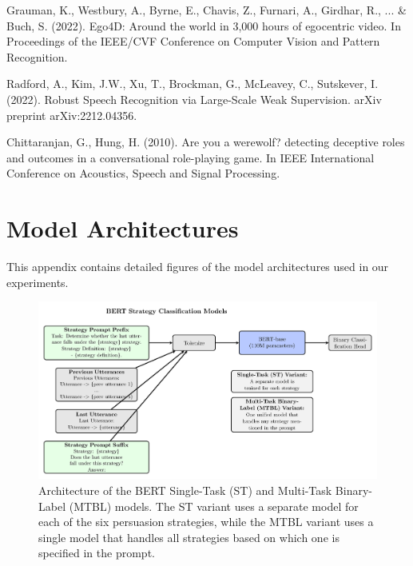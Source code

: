 \documentclass{article}
\begin{document}
\begin{thebibliography}{10}
Grauman, K., Westbury, A., Byrne, E., Chavis, Z., Furnari, A., Girdhar, R., ... \& Buch, S. (2022). Ego4D: Around the world in 3,000 hours of egocentric video. In Proceedings of the IEEE/CVF Conference on Computer Vision and Pattern Recognition.

Radford, A., Kim, J.W., Xu, T., Brockman, G., McLeavey, C., Sutskever, I. (2022). Robust Speech Recognition via Large-Scale Weak Supervision. arXiv preprint arXiv:2212.04356.

Chittaranjan, G., Hung, H. (2010). Are you a werewolf? detecting deceptive roles and outcomes in a conversational role-playing game. In IEEE International Conference on Acoustics, Speech and Signal Processing.

\end{thebibliography}

\appendix
\section{Model Architectures}
This appendix contains detailed figures of the model architectures used in our experiments.

\begin{figure}[H]
    \centering
    \includegraphics[width=\textwidth]{figures/png/bert_st_and_mtbl.png}
    \caption{Architecture of the BERT Single-Task (ST) and Multi-Task Binary-Label (MTBL) models. The ST variant uses a separate model for each of the six persuasion strategies, while the MTBL variant uses a single model that handles all strategies based on which one is specified in the prompt.}
    \label{fig:app_bert_st_and_mtbl}
\end{figure}
\end{document}
